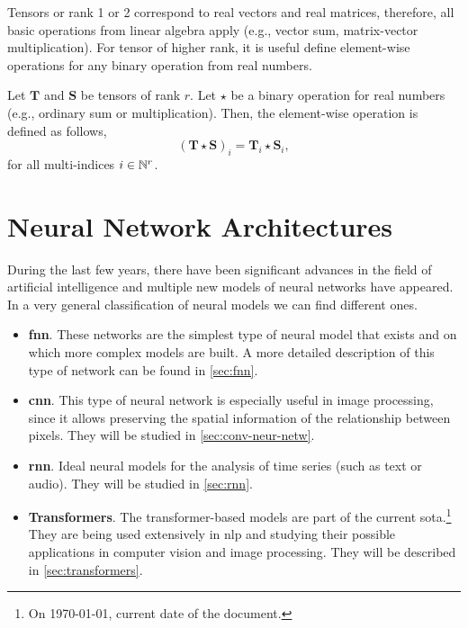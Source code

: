 Tensors or rank 1 or 2 correspond to real vectors and real matrices, therefore,
all basic operations from linear algebra apply (e.g., vector sum, matrix-vector
multiplication). For tensor of higher rank, it is useful define element-wise
operations for any binary operation from real numbers.

Let \(\mathbf{T}\) and \(\mathbf{S}\) be tensors of rank \(r\). Let \(\star\)
be a binary operation for real numbers (e.g., ordinary sum or
multiplication). Then, the element-wise operation is defined as follows,
\begin{equation}
  (\mathbf{T} \star \mathbf{S})_i = \mathbf{T}_i \star \mathbf{S}_i,
\end{equation}
for all multi-indices \(i \in \mathbb{N}^r\).


\section{Neural Network Architectures}

During the last few years, there have been significant advances in the field of
artificial intelligence and multiple new models of neural networks have
appeared. In a very general classification of neural models we can find
different ones.

\begin{itemize}
  \item \textbf{\acl*{fnn}}. These networks are the simplest type of neural
  model that exists and on which more complex models are built. A more detailed
  description of this type of network can be found in
  \vref{sec:fnn}.
  \item \textbf{\acl*{cnn}}. This type of neural network is especially useful
  in image processing, since it allows preserving the spatial information of
  the relationship between pixels. They will be studied in
  \vref{sec:conv-neur-netw}.
  \item \textbf{\acl*{rnn}}. Ideal neural models for the analysis of time
  series (such as text or audio). They will be studied in
  \vref{sec:rnn}.
  \item \textbf{Transformers}. The transformer-based models are part of the
  current \acl{sota}.\footnote{On \today, current date of the document.} They
  are being used extensively in \gls{nlp} and studying their possible
  applications in computer vision and image processing. They will be described
  in \vref{sec:transformers}.
\end{itemize}


